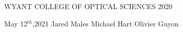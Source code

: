 \documentclass[dissertation,CC-BY-ND]{uathesis}
\begin{document}
\maketitlepage
{WYANT COLLEGE OF OPTICAL SCIENCES} %
{2020}	

\approval
{May 12$^{th}$,2021}		%
{Jared Males}	%
{Michael Hart}		%
{Olivier Guyon}





\tableofcontents

\listoffigures

\listoftables










\renewcommand{\baselinestretch}{1}		%
\small\normalsize						%

  

\end{document}
